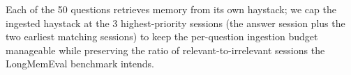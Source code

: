 Each of the 50 questions retrieves memory from its own haystack; we
cap the ingested haystack at the 3 highest-priority sessions (the
answer session plus the two earliest matching sessions) to keep the
per-question ingestion budget manageable while preserving the ratio
of relevant-to-irrelevant sessions the LongMemEval benchmark intends.
